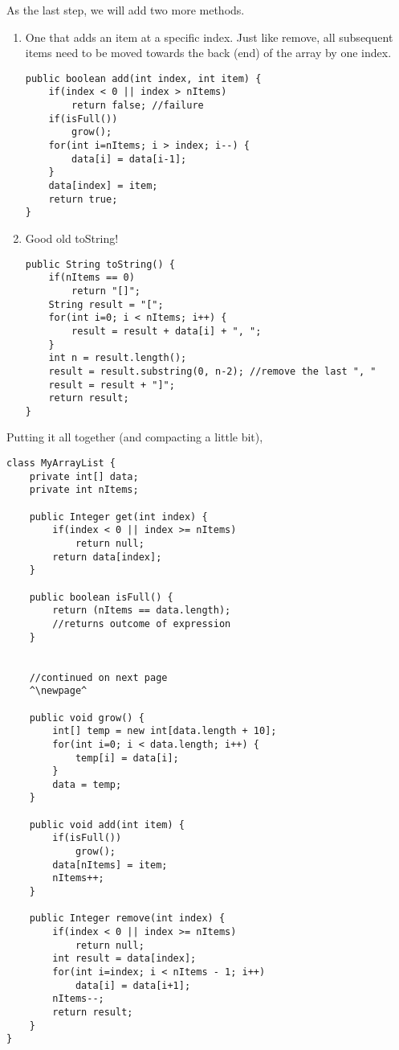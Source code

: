 As the last step, we will add two more methods. 

\begin{enumerate}
\item One that adds an item at a specific index. Just like remove, all subsequent items need to be moved towards the back (end) of the array by one index.

\begin{lstlisting}
public boolean add(int index, int item) {
	if(index < 0 || index > nItems)
		return false; //failure
	if(isFull())
		grow();
	for(int i=nItems; i > index; i--) {
		data[i] = data[i-1];
	}
	data[index] = item;
	return true;
}
\end{lstlisting}

\newpage

\item Good old toString!
\begin{lstlisting}
public String toString() {
	if(nItems == 0)
		return "[]";
	String result = "[";
	for(int i=0; i < nItems; i++) {
		result = result + data[i] + ", ";
	}
	int n = result.length();
	result = result.substring(0, n-2); //remove the last ", "
	result = result + "]";
	return result;
}
\end{lstlisting}
\end{enumerate}

\vskip 0.5cm

Putting it all together (and compacting a little bit), 

\vskip 0.5cm

\begin{lstlisting}[escapechar=^]
class MyArrayList {
	private int[] data;
	private int nItems;
	
	public Integer get(int index) {
		if(index < 0 || index >= nItems)
			return null;
		return data[index];
	}
	
	public boolean isFull() {
		return (nItems == data.length);  
		//returns outcome of expression
	}
	
	
	//continued on next page
	^\newpage^
	
	public void grow() {
		int[] temp = new int[data.length + 10];		
		for(int i=0; i < data.length; i++) {
			temp[i] = data[i];
		}
		data = temp;
	}		
	
	public void add(int item) {
		if(isFull())
			grow();
		data[nItems] = item;
		nItems++;
	}
	
	public Integer remove(int index) {
		if(index < 0 || index >= nItems)
			return null; 
		int result = data[index];
		for(int i=index; i < nItems - 1; i++)
			data[i] = data[i+1];
		nItems--;
		return result;
	}
}
\end{lstlisting}

